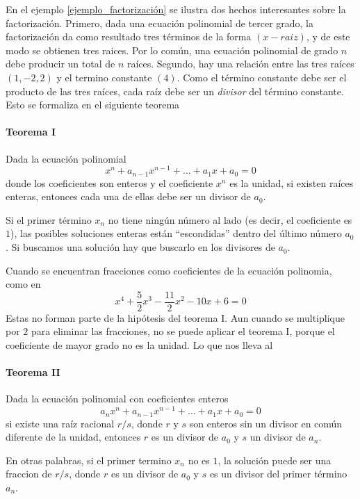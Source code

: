 En el ejemplo \ref{ejemplo_factorización} se ilustra dos hechos interesantes sobre la factorización. Primero, dada una ecuación polinomial de tercer grado, la factorización da como resultado tres términos de la forma \((x-raiz)\), y de este modo se obtienen tres raices. Por lo común, una ecuación polinomial de grado \(n\) debe producir un total de \(n\) raíces. Segundo, hay una relación entre las tres raíces \((1,-2,2)\) y el termino constante \((4)\). Como el término constante debe ser el producto de las tres raíces, cada raíz debe ser un \textit{divisor} del término constante. Esto se formaliza en el siguiente teorema

\paragraph{Teorema I}

Dada la ecuación polinomial
\[
x^n+a_{n-1}x^{n-1}+\dots+a_1x+a_0 = 0
\]
donde los coeficientes son enteros y el coeficiente \(x^n\) es la unidad, si existen raíces enteras, entonces cada una de ellas debe ser un divisor de \(a_0\).

Si el primer término \(x_n\) no tiene ningún número al lado (es decir, el coeficiente es \(1\)), las posibles soluciones enteras están ``escondidas'' dentro del último número \(a_0\). Si buscamos una solución hay que buscarlo en los divisores de \(a_0\).

Cuando se encuentran fracciones como coeficientes de la ecuación polinomia, como en 
\[
x^4+\frac{5}{2}x^3-\frac{11}{2}x^2-10x+6 = 0
\]
Estas no forman parte de la hipótesis del teorema I. Aun cuando se multiplique por \(2\) para eliminar las fracciones, no se puede aplicar el teorema I, porque el coeficiente de mayor grado no es la unidad. Lo que nos lleva al 

\paragraph{Teorema II}

Dada la ecuación polinomial con coeficientes enteros 
\[
a_nx^n + a_{n-1}x^{n-1}+\dots+a_1x+a_0 = 0
\]
si existe una raíz racional \(r/s\), donde \(r\) y \(s\) son enteros sin un divisor en común diferente de la unidad, entonces \(r\) es un divisor de \(a_0\) y \(s\) un divisor de \(a_n\).

En otras palabras, si el primer termino \(x_n\) no es \(1\), la solución puede ser una fraccion de \(r/s\), donde \(r\) es un divisor de \(a_0\) y \(s\) es un divisor del primer término \(a_n\).

